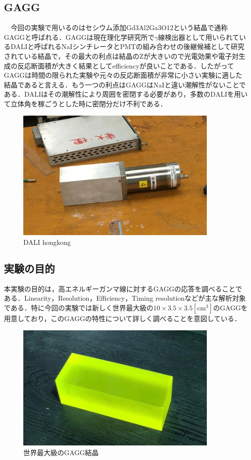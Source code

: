 \documentclass[a4j]{jarticle}
\begin{document}
\subsection{GAGG}
　今回の実験で用いるのはセシウム添加Gd3Al2Ga3O12という結晶で通称GAGGと呼ばれる．GAGGは現在理化学研究所で$\gamma$線検出器として用いられているDALIと呼ばれるNaIシンチレータとPMTの組み合わせの後継候補として研究されている結晶で，その最大の利点は結晶のZが大きいので光電効果や電子対生成の反応断面積が大きく結果としてefficiencyが良いことである．したがってGAGGは時間の限られた実験や元々の反応断面積が非常に小さい実験に適した結晶であると言える．もう一つの利点はGAGGはNaIと違い潮解性がないことである．DALIはその潮解性により周囲を密閉する必要があり，多数のDALIを用いて立体角を稼ごうとした時に密閉分だけ不利である．
 \begin{figure}[htb]
  \centering
  \includegraphics[bb=0 0 2467 1613,width=10cm]{DALI.jpg}
  \caption{DALI hongkong}
 \end{figure}


\subsection{実験の目的}
本実験の目的は，高エネルギーガンマ線に対するGAGGの応答を調べることである．Linearity，Resolution，Efficiency，Timing resolutionなどが主な解析対象である．特に今回の実験では新しく世界最大級の$10\times 3.5\times 3.5\mathrm{[cm^3]}$のGAGGを用意しており，このGAGGの特性について詳しく調べることを意図している．
  \begin{figure}[htb]
   \centering
  \includegraphics[bb=0 0 804 505,width=10cm]{GAGG.jpg}
  \caption{世界最大級のGAGG結晶}
  \label{005006_3Sep18}
  \end{figure}
\end{document}
